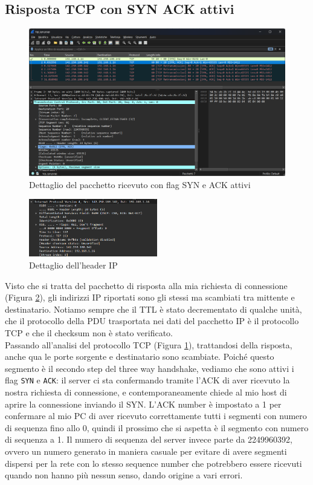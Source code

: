 \documentclass[12pt,a4paper]{report}
\begin{document}
\subsection{Risposta TCP con SYN ACK attivi}
\begin{figure}[H]
	\centering
	\includegraphics[width=1\textwidth]{tcp_syn_ack_reply}
 	\caption{Dettaglio del pacchetto ricevuto con flag SYN e ACK attivi}
	\label{tcp_syn_ack_reply}
\end{figure}
\begin{figure}[H]
	\centering
	\includegraphics[width=0.5\textwidth]{tcp_syn_ack_reply_ip_layer}
 	\caption{Dettaglio dell'header IP}
	\label{tcp_syn_ack_reply_ip_layer}
\end{figure}
Visto che si tratta del pacchetto di risposta alla mia richiesta di connessione (Figura \ref{tcp_syn_ack_reply_ip_layer}), gli indirizzi IP riportati sono gli stessi ma scambiati tra mittente e destinatario. Notiamo sempre che il TTL è stato decrementato di qualche unità, che il protocollo della PDU trasportata nei dati del pacchetto IP è il protocollo TCP e che il checksum non è stato verificato. \\
Passando all'analisi del protocollo TCP (Figura \ref{tcp_syn_ack_reply}), trattandosi della risposta, anche qua le porte sorgente e destinatario sono scambiate.
Poiché questo segmento è il secondo step del three way handshake, vediamo che sono attivi i flag \texttt{SYN} e \texttt{ACK}: il server ci sta confermando tramite l'ACK di aver ricevuto la nostra richiesta di connessione, e contemporaneamente chiede al mio host di aprire la connessione inviando il SYN.
L'ACK number è impostato a 1 per confermare al mio PC di aver ricevuto correttamente tutti i segmenti con numero di sequenza fino allo 0, quindi il prossimo che si aspetta è il segmento con numero di sequenza a 1. 
Il numero di sequenza del server invece parte da 2249960392, ovvero un numero generato in maniera casuale per evitare di avere segmenti dispersi per la rete con lo stesso sequence number che potrebbero essere ricevuti quando non hanno più nessun senso, dando origine a vari errori.
\end{document}
